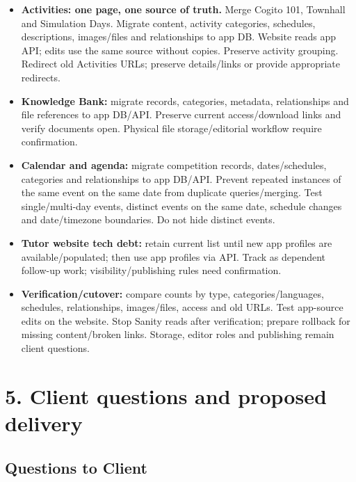 \documentclass[11pt,a4paper]{article}
\begin{document}
\begin{itemize}
\item \textbf{Activities: one page, one source of truth.} Merge Cogito 101, Townhall and Simulation Days. Migrate content, activity categories, schedules, descriptions, images/\allowbreak{}files and relationships to app DB. Website reads app API; edits use the same source without copies. Preserve activity grouping. Redirect old Activities URLs; preserve details/\allowbreak{}links or provide appropriate redirects.
\item \textbf{Knowledge Bank:} migrate records, categories, metadata, relationships and file references to app DB/\allowbreak{}API. Preserve current access/\allowbreak{}download links and verify documents open. Physical file storage/\allowbreak{}editorial workflow require confirmation.
\item \textbf{Calendar and agenda:} migrate competition records, dates/\allowbreak{}schedules, categories and relationships to app DB/\allowbreak{}API. Prevent repeated instances of the same event on the same date from duplicate queries/\allowbreak{}merging. Test single/\allowbreak{}multi-day events, distinct events on the same date, schedule changes and date/\allowbreak{}timezone boundaries. Do not hide distinct events.
\item \textbf{Tutor website tech debt:} retain current list until new app profiles are available/\allowbreak{}populated; then use app profiles via API. Track as dependent follow-up work; visibility/\allowbreak{}publishing rules need confirmation.
\item \textbf{Verification/\allowbreak{}cutover:} compare counts by type, categories/\allowbreak{}languages, schedules, relationships, images/\allowbreak{}files, access and old URLs. Test app-source edits on the website. Stop Sanity reads after verification; prepare rollback for missing content/\allowbreak{}broken links. Storage, editor roles and publishing remain client questions.
\end{itemize}

\section*{5. Client questions and proposed delivery}

\subsection*{Questions to Client}
\end{document}

